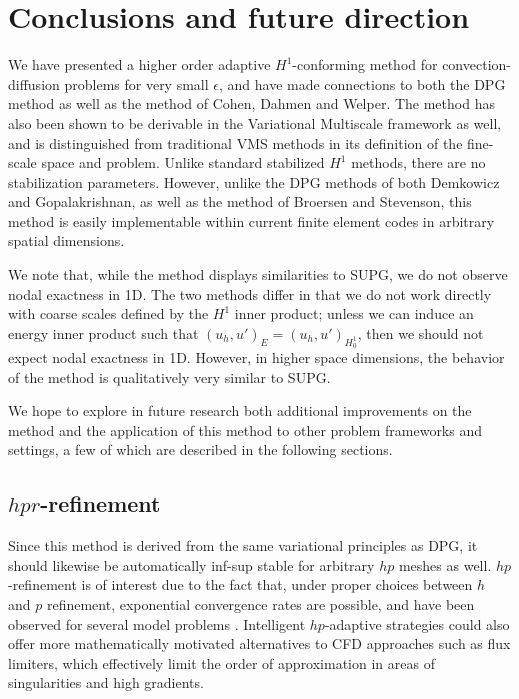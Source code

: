 \documentclass[final,leqno]{siamltex}
\newcommand{\LRp}[1]{\left( #1 \right)}
\begin{document}

\section{Conclusions and future direction}

We have presented a higher order adaptive $H^1$-conforming method for convection-diffusion problems for very small $\epsilon$, and have made connections to both the DPG method as well as the method of Cohen, Dahmen and Welper.  The method has also been shown to be derivable in the Variational Multiscale framework as well, and is distinguished from traditional VMS methods in its definition of the fine-scale space and problem.  Unlike standard stabilized $H^1$ methods, there are no stabilization parameters.  However, unlike the DPG methods of both Demkowicz and Gopalakrishnan, as well as the method of Broersen and Stevenson, this method is easily implementable within current finite element codes in arbitrary spatial dimensions.

We note that, while the method displays similarities to SUPG, we do not observe nodal exactness in 1D.  The two methods differ in that we do not work directly with coarse scales defined by the $H^1$ inner product; unless we can induce an energy inner product such that $\LRp{u_h,u'}_E = \LRp{u_h,u'}_{H^1_0}$, then we should not expect nodal exactness in 1D.  However, in higher space dimensions, the behavior of the method is qualitatively very similar to SUPG.  

We hope to explore in future research both additional improvements on the method and the application of this method to other problem frameworks and settings, a few of which are described in the following sections.  

\subsection{$hpr$-refinement}

Since this method is derived from the same variational principles as DPG, it should likewise be automatically inf-sup stable for arbitrary $hp$ meshes as well.  $hp$-refinement is of interest due to the fact that, under proper choices between $h$ and $p$ refinement, exponential convergence rates are possible, and have been observed for several model problems \cite{demkowicz2006computing}.  Intelligent $hp$-adaptive strategies could also offer more mathematically motivated alternatives to CFD approaches such as flux limiters, which effectively limit the order of approximation in areas of singularities and high gradients.  
\end{document}
